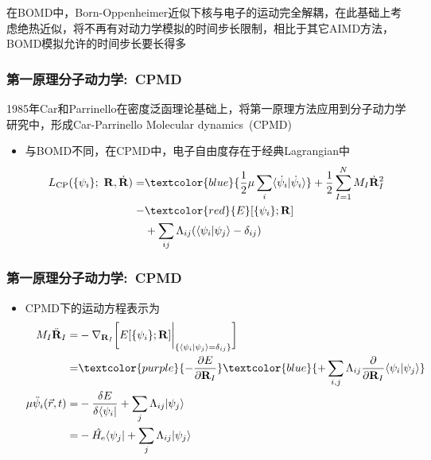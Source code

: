{{	\vskip 5pt
	在\textrm{BOMD}中，\textrm{Born-Oppenheimer}近似下核与电子的运动完全解耦，在此基础上考虑绝热近似，将不再有对动力学模拟的时间步长限制，相比于其它\textrm{AIMD}方法，\textrm{BOMD}模拟允许的时间步长要长得多
}

\frame
{
	\frametitle{第一原理分子动力学:~\textrm{CPMD}}
	1985年\textrm{Car}和\textrm{Parrinello}在密度泛函理论基础上，将第一原理方法应用到分子动力学研究中，形成\textrm{Car-Parrinello Molecular dynamics~(CPMD)}
	\begin{itemize}
		\item 与\textrm{BOMD}不同，在\textrm{CPMD}中，电子自由度存在于经典\textrm{Lagrangian}中
			\begin{displaymath}
				\begin{aligned}
					L_{\mathrm{CP}}(\{\psi_i\};~\mathbf{R},\dot{\mathbf{R}})=&\textcolor{blue}{\dfrac12\mu\sum_i\langle\dot{\psi}_i|\dot{\psi}_i\rangle}+\dfrac12\sum_{I=1}^NM_I\dot{\mathbf{R}}^2_I\\
					-&\textcolor{red}{E}[\{\psi_i\};\mathbf{R}]\\
					&+\sum_{ij}\Lambda_{ij}(\langle\psi_i|\psi_j\rangle-\delta_{ij})
				\end{aligned}
			\end{displaymath}
			{\fontsize{6.2pt}{4.2pt}}
	\end{itemize}
}

\frame
{
	\frametitle{第一原理分子动力学:~\textrm{CPMD}}
	\begin{itemize}
		\item \textrm{CPMD}下的运动方程表示为
			\begin{displaymath}
				\begin{aligned}
					M_I\ddot{\mathbf{R}}_I=&-\nabla_{\mathbf{R}_I}\bigg[E[\{\psi_i\};\mathbf{R}]\bigg|_{\{\langle\psi_i|\psi_j\rangle=\delta_{ij}\}}\bigg]\\
					=&\textcolor{purple}{-\dfrac{\partial E}{\partial\mathbf{R}_I}}\textcolor{blue}{+\sum_{i,j}\Lambda_{ij}\dfrac{\partial}{\partial \mathbf{R}_I}\langle\psi_i|\psi_j\rangle}\\
					\mu\ddot{\psi}_i(\vec r,t)=&-\dfrac{\delta E}{\delta\langle\psi_i|}+\sum_j\Lambda_{ij}|\psi_j\rangle\\
					=&-\hat{H_{\mathrm{e}}}\langle\psi_j|+\sum_j\Lambda_{ij}|\psi_j\rangle
				\end{aligned}
			\end{displaymath}
			{\fontsize{6.2pt}{4.2pt}}
	\end{itemize}
}

}

